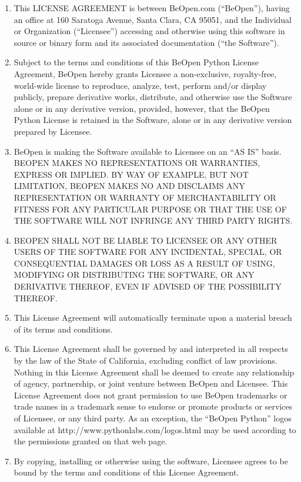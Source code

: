 \centerline{}

\centerline{}

\begin{enumerate}
\item
This LICENSE AGREEMENT is between BeOpen.com (``BeOpen''), having an
office at 160 Saratoga Avenue, Santa Clara, CA 95051, and the
Individual or Organization (``Licensee'') accessing and otherwise
using this software in source or binary form and its associated
documentation (``the Software'').

\item
Subject to the terms and conditions of this BeOpen Python License
Agreement, BeOpen hereby grants Licensee a non-exclusive,
royalty-free, world-wide license to reproduce, analyze, test, perform
and/or display publicly, prepare derivative works, distribute, and
otherwise use the Software alone or in any derivative version,
provided, however, that the BeOpen Python License is retained in the
Software, alone or in any derivative version prepared by Licensee.

\item
BeOpen is making the Software available to Licensee on an ``AS IS''
basis.  BEOPEN MAKES NO REPRESENTATIONS OR WARRANTIES, EXPRESS OR
IMPLIED.  BY WAY OF EXAMPLE, BUT NOT LIMITATION, BEOPEN MAKES NO AND
DISCLAIMS ANY REPRESENTATION OR WARRANTY OF MERCHANTABILITY OR FITNESS
FOR ANY PARTICULAR PURPOSE OR THAT THE USE OF THE SOFTWARE WILL NOT
INFRINGE ANY THIRD PARTY RIGHTS.

\item
BEOPEN SHALL NOT BE LIABLE TO LICENSEE OR ANY OTHER USERS OF THE
SOFTWARE FOR ANY INCIDENTAL, SPECIAL, OR CONSEQUENTIAL DAMAGES OR LOSS
AS A RESULT OF USING, MODIFYING OR DISTRIBUTING THE SOFTWARE, OR ANY
DERIVATIVE THEREOF, EVEN IF ADVISED OF THE POSSIBILITY THEREOF.

\item
This License Agreement will automatically terminate upon a material
breach of its terms and conditions.

\item
This License Agreement shall be governed by and interpreted in all
respects by the law of the State of California, excluding conflict of
law provisions.  Nothing in this License Agreement shall be deemed to
create any relationship of agency, partnership, or joint venture
between BeOpen and Licensee.  This License Agreement does not grant
permission to use BeOpen trademarks or trade names in a trademark
sense to endorse or promote products or services of Licensee, or any
third party.  As an exception, the ``BeOpen Python'' logos available
at http://www.pythonlabs.com/logos.html may be used according to the
permissions granted on that web page.

\item
By copying, installing or otherwise using the software, Licensee
agrees to be bound by the terms and conditions of this License
Agreement.
\end{enumerate}


